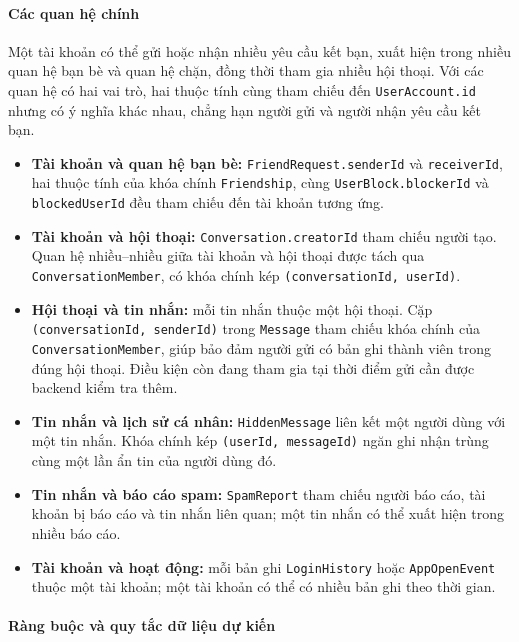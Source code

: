 \paragraph{Các quan hệ chính}
\mbox{}\par

Một tài khoản có thể gửi hoặc nhận nhiều yêu cầu kết bạn, xuất hiện trong
nhiều quan hệ bạn bè và quan hệ chặn, đồng thời tham gia nhiều hội thoại.
Với các quan hệ có hai vai trò, hai thuộc tính cùng tham chiếu đến
\texttt{UserAccount.id} nhưng có ý nghĩa khác nhau, chẳng hạn người gửi
và người nhận yêu cầu kết bạn.

\begin{itemize}
  \item \textbf{Tài khoản và quan hệ bạn bè:}
    \texttt{FriendRequest.senderId} và \texttt{receiverId},
    hai thuộc tính của khóa chính \texttt{Friendship},
    cùng \texttt{UserBlock.blockerId} và \texttt{blockedUserId}
    đều tham chiếu đến tài khoản tương ứng.
  \item \textbf{Tài khoản và hội thoại:}
    \texttt{Conversation.creatorId} tham chiếu người tạo.
    Quan hệ nhiều--nhiều giữa tài khoản và hội thoại được tách qua
    \texttt{ConversationMember}, có khóa chính kép
    \texttt{(conversationId, userId)}.
  \item \textbf{Hội thoại và tin nhắn:}
    mỗi tin nhắn thuộc một hội thoại. Cặp
    \texttt{(conversationId, senderId)} trong \texttt{Message}
    tham chiếu khóa chính của \texttt{ConversationMember}, giúp bảo đảm
    người gửi có bản ghi thành viên trong đúng hội thoại.
    Điều kiện còn đang tham gia tại thời điểm gửi cần được backend kiểm tra thêm.
  \item \textbf{Tin nhắn và lịch sử cá nhân:}
    \texttt{HiddenMessage} liên kết một người dùng với một tin nhắn.
    Khóa chính kép \texttt{(userId, messageId)} ngăn ghi nhận trùng
    cùng một lần ẩn tin của người dùng đó.
  \item \textbf{Tin nhắn và báo cáo spam:}
    \texttt{SpamReport} tham chiếu người báo cáo, tài khoản bị báo cáo
    và tin nhắn liên quan; một tin nhắn có thể xuất hiện trong nhiều báo cáo.
  \item \textbf{Tài khoản và hoạt động:}
    mỗi bản ghi \texttt{LoginHistory} hoặc \texttt{AppOpenEvent}
    thuộc một tài khoản; một tài khoản có thể có nhiều bản ghi theo thời gian.
\end{itemize}

\paragraph{Ràng buộc và quy tắc dữ liệu dự kiến}
\mbox{}\par

